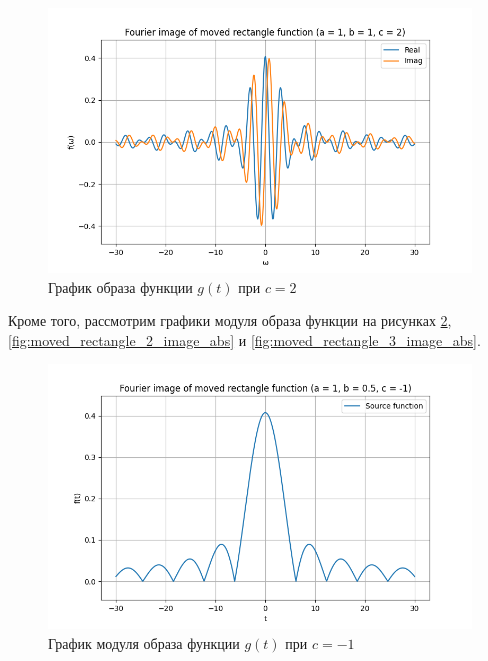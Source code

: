 \begin{figure}[ht!]
    \centering
    \includegraphics[width=\textwidth]{media/moved_rectangle_3_image.png}
    \caption{График образа функции $g(t)$ при $c = 2$}
    \label{fig:moved_rectangle_3_image}
\end{figure}

Кроме того, рассмотрим графики модуля образа функции на рисунках \ref{fig:moved_rectangle_1_image_abs}, \ref{fig:moved_rectangle_2_image_abs} и \ref{fig:moved_rectangle_3_image_abs}.

\begin{figure}[ht!]
    \centering
    \includegraphics[width=\textwidth]{media/moved_rectangle_1_image_abs.png}
    \caption{График модуля образа функции $g(t)$ при $c = -1$}
    \label{fig:moved_rectangle_1_image_abs}
\end{figure}

